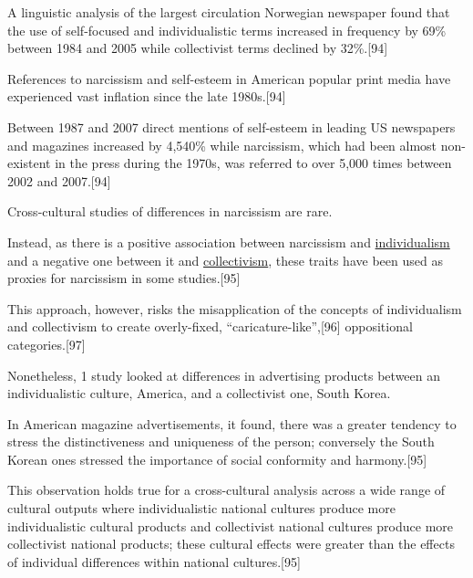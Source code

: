 \documentclass[oneside]{book}
\numberwithin{equation}{section}
\begin{document}
A linguistic analysis of the largest circulation Norwegian newspaper found that the use of self-focused and individualistic terms increased in frequency by 69\% between 1984 and 2005 while collectivist terms declined by 32\%.[94]

References to narcissism and self-esteem in American popular print media have experienced vast inflation since the late 1980s.[94]

Between 1987 and 2007 direct mentions of self-esteem in leading US newspapers and magazines increased by 4,540\% while narcissism, which had been almost non-existent in the press during the 1970s, was referred to over 5,000 times between 2002 and 2007.[94]

%
Cross-cultural studies of differences in narcissism are rare.

Instead, as there is a positive association between narcissism and \href{https://en.wikipedia.org/wiki/Individualism}{individualism} and a negative one between it and \href{https://en.wikipedia.org/wiki/Collectivism}{collectivism}, these traits have been used as proxies for narcissism in some studies.[95]

This approach, however, risks the misapplication of the concepts of individualism and collectivism to create overly-fixed, ``caricature-like'',[96] oppositional categories.[97]

Nonetheless, 1 study looked at differences in advertising products between an individualistic culture, America, and a collectivist one, South Korea.

In American magazine advertisements, it found, there was a greater tendency to stress the distinctiveness and uniqueness of the person; conversely the South Korean ones stressed the importance of social conformity and harmony.[95]

This observation holds true for a cross-cultural analysis across a wide range of cultural outputs where individualistic national cultures produce more individualistic cultural products and collectivist national cultures produce more collectivist national products; these cultural effects were greater than the effects of individual differences within national cultures.[95]
\end{document}
